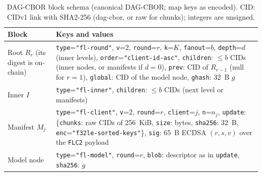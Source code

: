 \documentclass[final,3p,times,twocolumn]{elsarticle}
\begin{document}
\begin{table}[t]
\centering\scriptsize
\caption{DAG-CBOR block schema (canonical DAG-CBOR; map keys as encoded). CID: CIDv1 link with SHA2-256 (dag-cbor, or raw for chunks); integers are unsigned.}
\label{tab:schema}
\setlength{\tabcolsep}{3pt}
\begin{tabular}{@{}L{1.35cm}L{6.25cm}@{}}
\toprule
Block & Keys and values\\
\midrule
Root $R_r$ (its digest is on-chain) & \texttt{type}=\texttt{"fl-round"}, \texttt{v}=2, \texttt{round}=$r$, \texttt{k}=$K$, \texttt{fanout}=$b$, \texttt{depth}=$d$ (inner levels), \texttt{order}=\texttt{"client-id-asc"}, \texttt{children}: $\le b$ CIDs (inner nodes, or manifests if $d=0$), \texttt{prev}: CID of $R_{r-1}$ (null for $r=1$), \texttt{global}: CID of the model node, \texttt{ghash}: 32~B $g$\\
Inner $I$ & \texttt{type}=\texttt{"fl-inner"}, \texttt{children}: $\le b$ CIDs (next level or manifests)\\
Manifest $M_j$ & \texttt{type}=\texttt{"fl-client"}, \texttt{v}=2, \texttt{round}=$r$, \texttt{client}=$j$, \texttt{n}=$n_j$, \texttt{update}: \{\texttt{chunks}: raw CIDs of 256~KiB, \texttt{size}: bytes, \texttt{sha256}: 32~B, \texttt{enc}=\texttt{"f32le-sorted-keys"}\}, \texttt{sig}: 65~B ECDSA $(r,s,v)$ over the \texttt{FLC2} payload\\
Model node & \texttt{type}=\texttt{"fl-model"}, \texttt{round}=$r$, \texttt{blob}: descriptor as in \texttt{update}, \texttt{sha256}: $g$\\
\bottomrule
\end{tabular}
\end{table}
\end{document}
